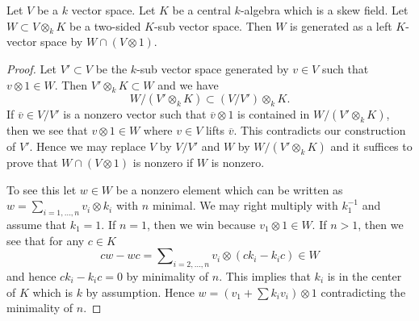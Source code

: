\begin{lemma}
\label{lemma-generate-two-sided-sub}
Let $V$ be a $k$ vector space. Let $K$ be a central $k$-algebra
which is a skew field. Let $W \subset V \otimes_k K$ be a two-sided
$K$-sub vector space. Then $W$ is generated as a left $K$-vector
space by $W \cap (V \otimes 1)$.
\end{lemma}

\begin{proof}
Let $V' \subset V$ be the $k$-sub vector space generated by $v \in V$
such that $v \otimes 1 \in W$. Then $V' \otimes_k K \subset W$ and
we have
$$
W/(V' \otimes_k K)  \subset  (V/V') \otimes_k K.
$$
If $\overline{v} \in V/V'$ is a nonzero vector such that
$\overline{v} \otimes 1$ is contained in $W/(V' \otimes_k K)$,
then we see that $v \otimes 1 \in W$ where $v \in V$ lifts $\overline{v}$.
This contradicts our construction of $V'$. Hence we may replace
$V$ by $V/V'$ and $W$ by $W/(V' \otimes_k K)$ and it suffices to prove
that $W \cap (V \otimes 1)$ is nonzero if $W$ is nonzero.

\medskip\noindent
To see this let $w \in W$ be a nonzero element which can be written
as $w = \sum_{i = 1, \ldots, n} v_i \otimes k_i$ with $n$ minimal.
We may right multiply with $k_1^{-1}$ and assume that $k_1 = 1$.
If $n = 1$, then we win because $v_1 \otimes 1 \in W$.
If $n > 1$, then we see that for any $c \in K$
$$
c w - w c = \sum\nolimits_{i = 2, \ldots, n} v_i \otimes (c k_i - k_i c) \in W
$$
and hence $c k_i - k_i c = 0$ by minimality of $n$.
This implies that $k_i$ is in the center of $K$ which is $k$ by
assumption. Hence $w = (v_1 + \sum k_i v_i) \otimes 1$ contradicting
the minimality of $n$.
\end{proof}
